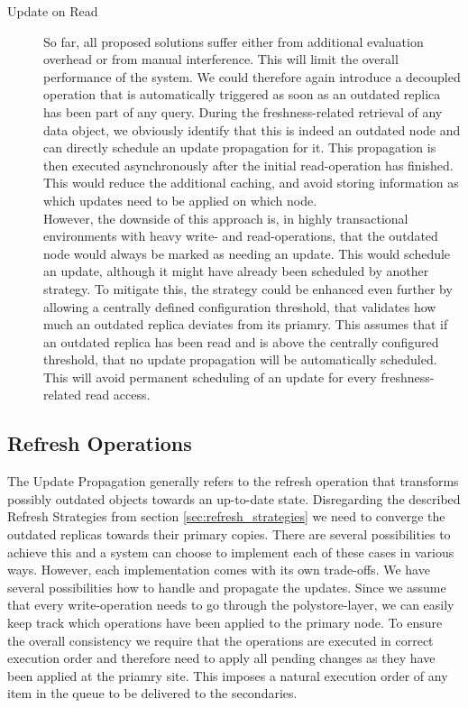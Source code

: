\begin{description}
    \item[Update on Read] So far, all proposed solutions suffer either from additional evaluation overhead or from manual interference. This will limit the overall 
    performance of the system. We could therefore again introduce a decoupled operation that is automatically triggered as soon as an outdated replica has been part of any query. 
    During the freshness-related retrieval of any data object, we obviously identify that this is indeed an outdated node and can directly schedule an update propagation for it. This propagation is then
    executed asynchronously after the initial read-operation has finished. This would reduce the additional caching, and avoid storing 
    information as which updates need to be applied on which node.\\
    However, the downside of this approach is, in highly transactional environments with heavy write- and read-operations, that the outdated node would always be marked as 
    needing an update. This would schedule an update, although it might have already been scheduled by another strategy. 
    To mitigate this, the strategy could be enhanced even further by allowing a centrally defined configuration threshold, that validates how much an outdated replica deviates from its priamry. 
    This assumes that if an outdated replica has been read and is above the centrally configured threshold, that no update propagation will be automatically scheduled.
    This will avoid permanent scheduling of an update for every freshness-related read access.

\end{description}





\subsection{Refresh Operations}
\label{sec:refresh_operations}

The Update Propagation generally refers to the refresh operation that transforms possibly outdated objects towards an up-to-date state.
Disregarding the described Refresh Strategies from section \ref{sec:refresh_strategies} we need to converge the outdated replicas towards their 
primary copies.
There are several possibilities to achieve this and a system can choose to implement each of these cases in various ways. However, each implementation comes with its
own trade-offs.
We have several possibilities how to handle and propagate the updates.
Since we assume that every write-operation needs to go through the polystore-layer, we can easily keep track which operations have been applied to the primary node.
To ensure the overall consistency we require that the operations are executed in correct execution order and therefore need to apply all pending changes as they have been applied at the priamry site.
This imposes a natural execution order of any item in the queue to be delivered to the secondaries.

